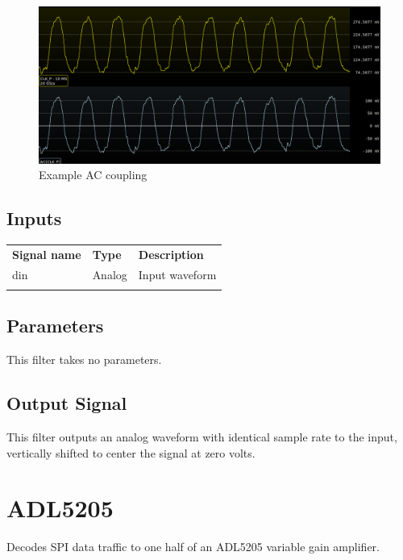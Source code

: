 \begin{figure}[h]
\centering
\includegraphics[width=16cm]{images/filters/ac-couple.png}
\caption{Example AC coupling}
\end{figure}

\subsection{Inputs}

\begin{tabularx}{16cm}{llX}
\thickhline
\textbf{Signal name} & \textbf{Type} & \textbf{Description} \\
\thickhline
din & Analog & Input waveform \\
\thickhline
\end{tabularx}

\subsection{Parameters}

This filter takes no parameters.

\subsection{Output Signal}

This filter outputs an analog waveform with identical sample rate to the input, vertically shifted to center the signal
at zero volts.

\pagebreak
\section{ADL5205}
\label{filter:adl5205}

Decodes SPI data traffic to one half of an ADL5205 variable gain amplifier.

